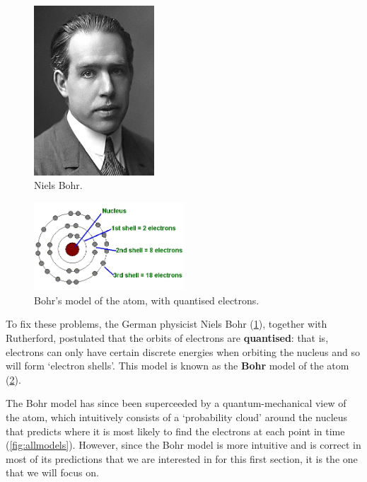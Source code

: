 \documentclass[a4paper]{amsbook}
\newcommand{\marginsymbol}{}
\theoremstyle{definition}
\numberwithin{exercise}{chapter}
\numberwithin{exercise}{chapter}
\begin{document}
\begin{figure}
  \centering
  \includegraphics[width=0.4\textwidth]{bohr}
  \caption{Niels Bohr. \label{fig:bohr}}
\end{figure}
\begin{figure}
  \centering
  \includegraphics[width=0.5\textwidth]{bohratom}
  \caption{Bohr's model of the atom, with quantised electrons. \label{fig:bohratom}}
\end{figure}
\marginsymbol To fix these problems, the German physicist Niels Bohr (\cref{fig:bohr}), together with Rutherford, postulated that the orbits of
electrons are \textbf{quantised}: that is, electrons can only have certain discrete energies when orbiting the nucleus and so will
form `electron shells'. This model is known as the \textbf{Bohr} model of the atom (\cref{fig:bohratom}).

The Bohr model has since been superceeded by a quantum-mechanical view of the atom, which intuitively consists of a `probability
cloud' around the nucleus that predicts where it is most likely to find the electrons at each point in time (\cref{fig:allmodels}).
However, since the Bohr model is more intuitive and is correct in most of its predictions that we are interested in for this first
section, it is the one that we will focus on.
\end{document}
